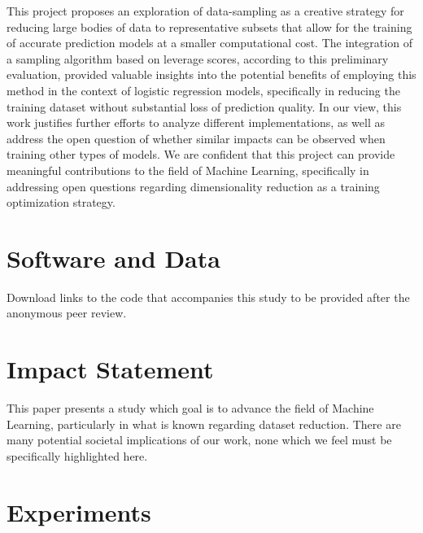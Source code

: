 \documentclass{article}
\theoremstyle{plain}
\theoremstyle{definition}
\theoremstyle{remark}
\begin{document}
This project proposes an exploration of data-sampling as a creative strategy for reducing large bodies of data to representative subsets that allow for the training of accurate prediction models at a smaller computational cost. The integration of a sampling algorithm based on leverage scores, according to this preliminary evaluation, provided valuable insights into the potential benefits of employing this method in the context of logistic regression models, specifically in reducing the training dataset without substantial loss of prediction quality. In our view, this work justifies further efforts to analyze different implementations, as well as address the open question of whether similar impacts can be observed when training other types of models. We are confident that this project can provide meaningful contributions to the field of Machine Learning, specifically in addressing open questions regarding dimensionality reduction as a training optimization strategy.


\section*{Software and Data}

Download links to the code that accompanies this study to be provided after the anonymous peer review.

\section*{Impact Statement}

This paper presents a study which goal is to advance the field of
Machine Learning, particularly in what is known regarding dataset reduction. There are many potential societal implications
of our work, none which we feel must be specifically highlighted here.






\newpage
\appendix
\twocolumn
\section{Experiments}
\end{document}
